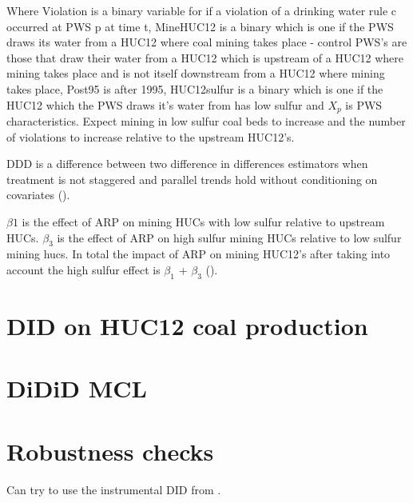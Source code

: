 \documentclass{article}
\begin{document}
Where Violation is a binary variable for if a violation of a drinking water rule c occurred at PWS p at time t, MineHUC12 is a binary which is one if the PWS draws its water from a HUC12 where coal mining takes place - control PWS's are those that draw their water from a HUC12 which is upstream of a HUC12 where mining takes place and is not itself downstream from a HUC12 where mining takes place, Post95 is after 1995, HUC12sulfur is a binary which is one if the HUC12 which the PWS draws it's water from has low sulfur and $X_p$ is PWS characteristics.
Expect mining in low sulfur coal beds to increase and the number of violations to increase relative to the upstream HUC12's.

DDD is a difference between two difference in differences estimators when treatment is not staggered and parallel trends hold without conditioning on covariates (\cite{baker2025difference}).

$\beta1$ is the effect of ARP on mining HUCs with low sulfur relative to upstream HUCs.
$\beta_3$ is the effect of ARP on high sulfur mining HUCs relative to low sulfur mining hucs.
In total the impact of ARP on mining HUC12's after taking into account the high sulfur effect is $\beta_1$ + $\beta_3$ (\cite{olden2022triple}).

\section{DID on HUC12 coal production}


\section{DiDiD MCL}




\section{Robustness checks}

Can try to use the instrumental DID from \cite{ye2023instrumented}.

\printbibliography
\end{document}
